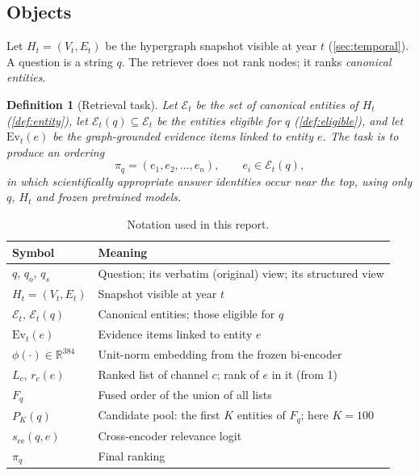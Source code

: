 \documentclass[11pt,a4paper]{article}
\newcommand{\cref}[1]{\autoref{#1}}
\newtheorem{definition}{Definition}[section]
\theoremstyle{remark}
\newcommand{\R}{\mathbb{R}}
\newcommand{\Ent}{\mathcal{E}}
\newcommand{\Ev}{\mathrm{Ev}}
\begin{document}
\subsection{Objects}

Let $H_t=(V_t,E_t)$ be the hypergraph snapshot visible at year $t$ (\cref{sec:temporal}).
A question is a string $q$. The retriever does not rank nodes; it ranks
\emph{canonical entities}.

\begin{definition}[Retrieval task]
\label{def:task}
Let $\Ent_t$ be the set of canonical entities of $H_t$ (\cref{def:entity}), let
$\Ent_t(q)\subseteq\Ent_t$ be the entities eligible for $q$ (\cref{def:eligible}), and
let $\Ev_t(e)$ be the graph-grounded evidence items linked to entity $e$. The task is to
produce an ordering
\begin{equation}
  \pi_q=(e_1,e_2,\dots,e_n),\qquad e_i\in\Ent_t(q),
\end{equation}
in which scientifically appropriate answer identities occur near the top, using only $q$,
$H_t$ and frozen pretrained models.
\end{definition}

\begin{table}[!htbp]
\centering
\caption[Notation]{Notation used in this report.}
\label{tab:notation}
\small
\begin{tabularx}{\linewidth}{lX}
\toprule
Symbol & Meaning\\
\midrule
$q$, $q_o$, $q_s$ & Question; its verbatim (original) view; its structured view\\
$H_t=(V_t,E_t)$ & Snapshot visible at year $t$\\
$\Ent_t$, $\Ent_t(q)$ & Canonical entities; those eligible for $q$\\
$\Ev_t(e)$ & Evidence items linked to entity $e$\\
$\phi(\cdot)\in\R^{384}$ & Unit-norm embedding from the frozen bi-encoder\\
$L_c$, $r_c(e)$ & Ranked list of channel $c$; rank of $e$ in it (from 1)\\
$F_q$ & Fused order of the union of all lists\\
$P_K(q)$ & Candidate pool: the first $K$ entities of $F_q$; here $K=100$\\
$s_{\mathrm{ce}}(q,e)$ & Cross-encoder relevance logit\\
$\pi_q$ & Final ranking\\
\bottomrule
\end{tabularx}
\end{table}
\end{document}
